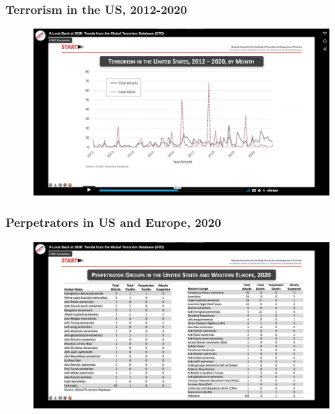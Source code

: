 \documentclass{beamer}
\begin{document}
\begin{frame} 
	\frametitle{\LARGE{Terrorism in the US, 2012-2020}}
	\begin{figure}[ht!]
		\centering
		\includegraphics[width=\textwidth,height=\textheight,keepaspectratio]{USterrorism2020.png}
	\end{figure}
\end{frame}

\begin{frame} 
	\frametitle{\LARGE{Perpetrators in US and Europe, 2020}}
	\begin{figure}[ht!]
		\centering
		\includegraphics[width=\textwidth,height=\textheight,keepaspectratio]{perpetrators2020.png}
	\end{figure}
\end{frame}
\end{document}
